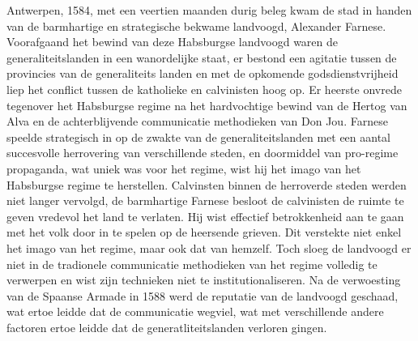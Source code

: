 \documentclass[12pt]{amsart}
\theoremstyle{definition}
\theoremstyle{remark}
\numberwithin{equation}{section}
\begin{document}






\noindent Antwerpen, 1584, met een veertien maanden durig beleg kwam de stad in handen van de barmhartige en
strategische bekwame landvoogd, Alexander Farnese. Voorafgaand het bewind van deze Habsburgse landvoogd waren de
generaliteitslanden in een wanordelijke staat, er bestond een agitatie tussen de provincies van de generaliteits landen
en met de opkomende godsdienstvrijheid liep het conflict tussen de katholieke en calvinisten hoog op. Er heerste
onvrede tegenover het Habsburgse regime na het hardvochtige bewind van de Hertog van Alva en de achterblijvende
communicatie methodieken van Don Jou. Farnese speelde strategisch in op de zwakte van de generaliteitslanden met een
aantal succesvolle herrovering van verschillende steden, en doormiddel van pro-regime propaganda, wat uniek was voor
het regime, wist hij het imago van het Habsburgse regime te herstellen. Calvinsten binnen de herroverde steden werden
niet langer vervolgd, de barmhartige Farnese besloot de calvinisten de ruimte te geven vredevol het land te verlaten.
Hij wist effectief betrokkenheid aan te gaan met het volk door in te spelen op de heersende grieven. Dit verstekte niet
enkel het imago van het regime, maar ook dat van hemzelf. Toch sloeg de landvoogd er niet in de tradionele communicatie
methodieken van het regime volledig te verwerpen en wist zijn technieken niet te institutionaliseren.
Na de verwoesting van de Spaanse Armade in 1588 werd de reputatie van de landvoogd geschaad, wat ertoe leidde dat de
communicatie wegviel, wat met verschillende andere factoren ertoe leidde dat de generatliteitslanden verloren gingen.
\end{document}
